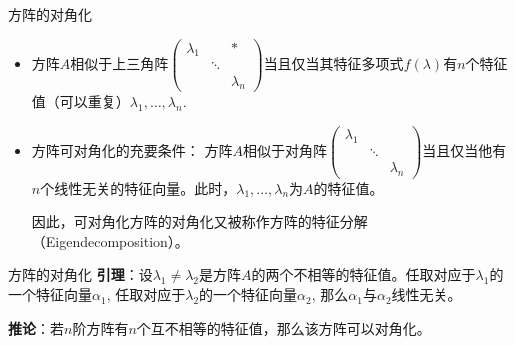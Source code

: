 \begin{frame}

\begin{block}{方阵的对角化}
\begin{itemize}
\item 方阵$A$相似于上三角阵\(\displaystyle \begin{pmatrix} \lambda_1 & & * \\ & \ddots & \\ & & \lambda_n \end{pmatrix}\)当且仅当其特征多项式$f(\lambda)$有$n$个特征值（可以重复）$\lambda_1,\ldots,\lambda_n$.

\vspace{2em}
\pause

\item 方阵可对角化的充要条件：\newline
方阵$A$相似于对角阵\(\displaystyle \begin{pmatrix} \lambda_1 & & \\ & \ddots & \\ & & \lambda_n \end{pmatrix}\)当且仅当他有$n$个线性无关的特征向量。此时，$\lambda_1,\ldots,\lambda_n$为$A$的特征值。

\vspace{1em}
\pause

因此，可对角化方阵的对角化又被称作方阵的特征分解（Eigendecomposition）。
\end{itemize}
\end{block}

\end{frame}


\begin{frame}

\begin{block}{方阵的对角化}
{\bfseries 引理}：设$\lambda_1\neq\lambda_2$是方阵$A$的两个不相等的特征值。任取对应于$\lambda_1$的一个特征向量$\alpha_1$, 任取对应于$\lambda_2$的一个特征向量$\alpha_2$, 那么$\alpha_1$与$\alpha_2$线性无关。

\vspace{2em}
\pause

{\bfseries 推论}：若$n$阶方阵有$n$个互不相等的特征值，那么该方阵可以对角化。
\end{block}

\end{frame}


